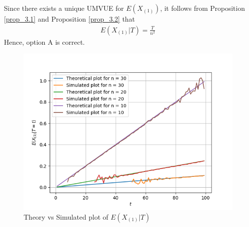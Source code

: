 \documentclass[journal,12pt,twocolumn]{IEEEtran}
\begin{document}
Since there exists a unique UMVUE for $E(X_{(1)})$, it follows from Proposition \ref{prop_3.1} and Proposition \ref{prop_3.2} that 
\begin{align}
E(X_{(1)} | T) = \frac{T}{n^2} 
\end{align}
Hence, option A is correct.
\begin{figure}[!hbt]
    \centering
	\includegraphics[width=\columnwidth]{./Figures/Figure_1.png}
    \caption{Theory vs Simulated plot of $E(X_{(1)} |T)$}
    \label{CDF_Y}
\end{figure}
\end{document}
